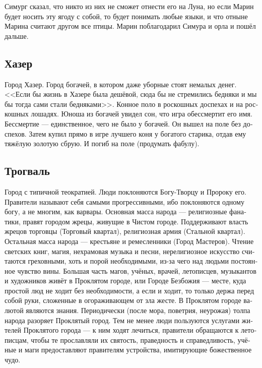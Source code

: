 \documentclass[a4paper,12pt,fleqn]{book}\usepackage{polyglossia}\setdefaultlanguage[babelshorthands=true]{russian}\setotherlanguage{english}\defaultfontfeatures{Ligatures=TeX,Mapping=tex-text}\usepackage{xcolor}\newcommand{\ml}[3]{#2}
\begin{document}
{Симург сказал, что никто из них не сможет отнести его на Луна, но если Марин будет носить эту ягоду с собой, то будет понимать любые языки, и что отныне Марина считают другом все птицы.
Марин поблагодарил Симура и орла и пошёл дальше.

\subsection{Хазер}

Город Хазер.
Город богачей, в котором даже уборные стоят немалых денег.
<<Если бы жизнь в Хазере была дешёвой, сюда бы не стремились бедняки и мы бы тогда сами стали бедняками>>.
Конное поло в роскошных доспехах и на роскошных лошадях.
Юноша из богачей увидел сон, что игра обессмертит его имя.
Бессмертие --- единственное, чего не было у богачей.
Он вышел на поле без доспехов.
Затем купил прямо в игре лучшего коня у богатого старика, отдав ему тяжёлую золотую сбрую.
И погиб на поле (продумать фабулу).

\subsection{Трогваль}

Город с типичной теократией.
Люди поклоняются Богу-Творцу и Пророку его.
Правители называют себя самыми прогрессивными, ибо поклоняются одному богу, а не многим, как варвары.
Основная масса народа --- религиозные фанатики, правят городом жрецы, живущие в Чистом городе.
Поддерживают власть жрецов торговцы (Торговый квартал), религиозная армия (Стальной квартал).
Остальная масса народа --- крестьяне и ремесленники (Город Мастеров).
Чтение светских книг, магия, нехрамовая музыка и песни, нерелигиозное искусство считаются греховными, хоть и порой необходимыми, из-за чего над людьми постоянное чувство вины.
Большая часть магов, учёных, врачей, летописцев, музыкантов и художников живёт в Проклятом городе, или Городе Безбожия --- месте, куда простой люд не ходит без необходимости, а если и ходит, то только держа перед собой руки, сложенные в огораживающем от зла жесте.
В Проклятом городе валютой являются знания.
Периодически (после мора, поветрия, неурожая) толпа народа разоряет Проклятый город.
Тем не менее люди пользуются услугами жителей Проклятого города --- к ним ходят лечиться, правители обращаются к летописцам, чтобы те прославляли их святость, праведность и справедливость, учёные и маги предоставляют правителям устройства, имитирующие божественное чудо.

}
\end{document}
